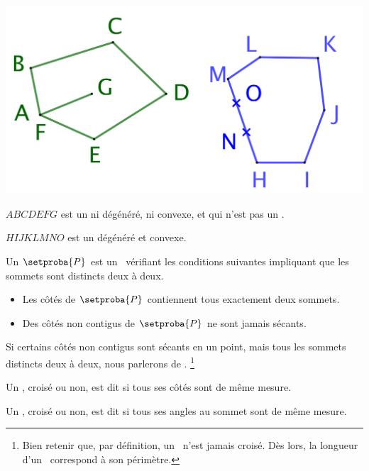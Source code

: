 \begin{center}
	\small\itshape\centering
	\includegraphics[scale=.35]{content/polygon/def/degenerated-ncycles.png}
	
	\smallskip
	$ABCDEFG$ est un  ni dégénéré, ni convexe, et qui n'est pas un \ngone.
	
	\smallskip
	$HIJKLMNO$ est un  dégénéré et convexe.
\end{center}




\newpage

\begin{defi}
	Un \focus{\ngone} $\setproba{P}$ est un \ncycle\ vérifiant les conditions suivantes impliquant que les sommets sont distincts deux à deux.
	\begin{itemize}
		\item Les côtés de $\setproba{P}$ contiennent tous exactement deux sommets.

		\item Des côtés non contigus de $\setproba{P}$ ne sont jamais sécants.
	\end{itemize}


	Si certains côtés non contigus sont sécants en un point, mais tous les sommets distincts deux à deux, nous parlerons de .%
	\footnote{
		Bien retenir que, par définition, un \ngone\ n'est jamais croisé.
		Dès lors, la longueur d'un \ngone\ correspond à son périmètre.
	}
\end{defi}


\begin{defi}
	Un \ngone, croisé ou non, est dit  si tous ses côtés sont de même mesure.
\end{defi}


\begin{defi}
	Un \ngone, croisé ou non, est dit  si tous ses angles au sommet sont de même mesure.
\end{defi}


